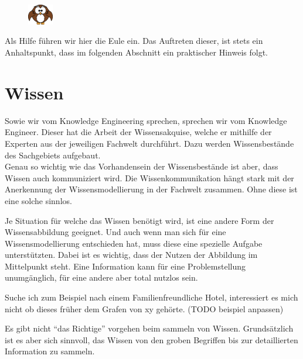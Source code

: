 \vspace{10pt}
\begin{figure}
    \vspace{-19pt}
    \includegraphics[width=0.1\textwidth]{bilder/owl.png}
\end{figure}
Als Hilfe führen wir hier die Eule ein. Das Auftreten dieser, ist stets ein Anhaltspunkt, dass im folgenden Abschnitt ein praktischer Hinweis folgt.


\section{Wissen}
\label{chap:einleitung_wissen}


Sowie wir vom Knowledge Engineering sprechen, sprechen wir vom Knowledge Engineer. Dieser hat die Arbeit der Wissensakquise, welche er mithilfe der Experten aus der jeweiligen Fachwelt durchführt. Dazu werden Wissensbestände des Sachgebiets aufgebaut. \\
Genau so wichtig wie das Vorhandensein der Wissensbestände ist aber, dass Wissen auch kommuniziert wird. Die Wissenkommunikation hängt stark mit der Anerkennung der Wissensmodellierung in der Fachwelt zusammen. Ohne diese ist eine solche sinnlos.
 
Je Situation für welche das Wissen benötigt wird, ist eine andere Form der Wissensabbildung geeignet. Und auch wenn man sich für eine Wissensmodellierung entschieden hat, muss diese eine spezielle Aufgabe unterstützten. Dabei ist es wichtig, dass der Nutzen der Abbildung im Mittelpunkt steht. Eine Information kann für eine Problemstellung unumgänglich, für eine andere aber total nutzlos sein.

\noindent\hspace*{15mm}Suche ich zum Beispiel nach einem Familienfreundliche Hotel, interessiert es mich nicht ob dieses früher dem Grafen von xy gehörte. (TODO beispiel anpassen)

Es gibt nicht "`das Richtige"' vorgehen beim sammeln von Wissen. Grundsätzlich ist es aber sich sinnvoll, das Wissen von den groben Begriffen bis zur detaillierten Information zu sammeln. 
